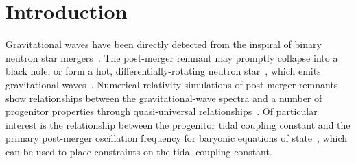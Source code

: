 \documentclass[../Thesis.tex]{subfiles}
\begin{document}
    \section{Introduction}
    \label{sec:introduction2}
    Gravitational waves have been directly detected from the inspiral of binary neutron star mergers~\cite{GW170817Detection,GW190425Detection}. 
    The  post-merger remnant may promptly collapse into a black hole, or form a hot, differentially-rotating neutron star~\cite{Baumgarte2000,Shibata2000bar}, which emits gravitational waves~\cite[e.g.,][]{Nakamura1994,New1997,Rasio1999,Shibata2005}.
    Numerical-relativity simulations of post-merger remnants show relationships between the gravitational-wave spectra and a number of progenitor properties through quasi-universal relationships~\cite[e.g.,][]{Bauswein2012,Bauswein2012a,Hotokezaka2013,Bernuzzi2014,Takami2014,Bernuzzi2015,Bauswein2015,Takami2015,Rezzolla2016,Bauswein2019}.
    Of particular interest is the relationship between the progenitor tidal coupling constant and the primary post-merger oscillation frequency for baryonic equations of state~\cite{Takami2015,Bernuzzi2015,Rezzolla2016,Breschi2019}, which can be used to place constraints on the tidal coupling constant.\par
    
\end{document}
